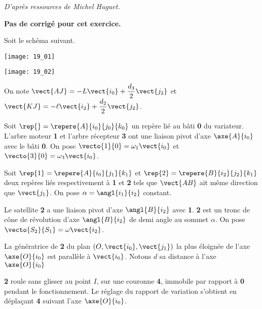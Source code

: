 \normalfalse \difficilefalse \tdifficiletrue
\correctionfalse


\begin{flushright}
\textit{D'après ressources de Michel Huguet.}
\end{flushright}
\setcounter{question}{0}
\ifcorrection
\else
\textbf{Pas de corrigé pour cet exercice.}
\fi

\ifprof
\else

Soit le schéma suivant. 
\begin{center}
\texttt{[image: 19\_01]}

\texttt{[image: 19\_02]}
\end{center}

On note
$\vect{AJ}=-L \vect{i_0}+\dfrac{d_3}{2}\vect{j_2}$
et 
$\vect{KJ}=-\ell \vect{i_2}+\dfrac{d_2}{2}\vect{j_2}$.

Soit $\rep{}=\repere{A}{i_0}{j_0}{k_0}$ un repère lié au bâti \textbf{0} du variateur. L’arbre moteur \textbf{1} et l’arbre récepteur
\textbf{3} ont une liaison pivot d’axe $\axe{A}{i_0}$ avec le bâti \textbf{0}. On pose $\vecto{1}{0}=\omega_1\vect{i_0}$ et $\vecto{3}{0}=\omega_3\vect{i_0}$. 

Soit $\rep{1}=\repere{A}{i_0}{j_1}{k_1}$  et $\rep{2}=\repere{B}{i_2}{j_2}{k_1}$ deux repères liés respectivement à \textbf{1} et \textbf{2} tels que $\vect{AB}$ ait même direction que  $\vect{j_1}$. On pose $\alpha =  \angl{i_1}{i_2}$ constant. 

Le satellite \textbf{2} a une liaison pivot d’axe $\angl{B}{i_2}$ avec \textbf{1}. \textbf{2} est un tronc de cône de
révolution d’axe $\angl{B}{i_2}$ de demi angle au sommet $\alpha$. On pose $\vecto{S_2}{S_1}=\omega\vect{i_2}$.

La génératrice de \textbf{2} du plan $\left(O,\vect{i_0},\vect{j_1} \right)$  la plus éloignée de l’axe $\axe{O}{i_0}$
 est parallèle à $\vect{i_0}$. Notons $d$ sa distance à l’axe $\axe{O}{i_0}$

\textbf{2} roule sans glisser au point $I$, sur une couronne \textbf{4}, immobile par rapport à \textbf{0} pendant le
fonctionnement. Le réglage du rapport de variation s’obtient en déplaçant \textbf{4} suivant l’axe
$\axe{O}{i_0}$.


